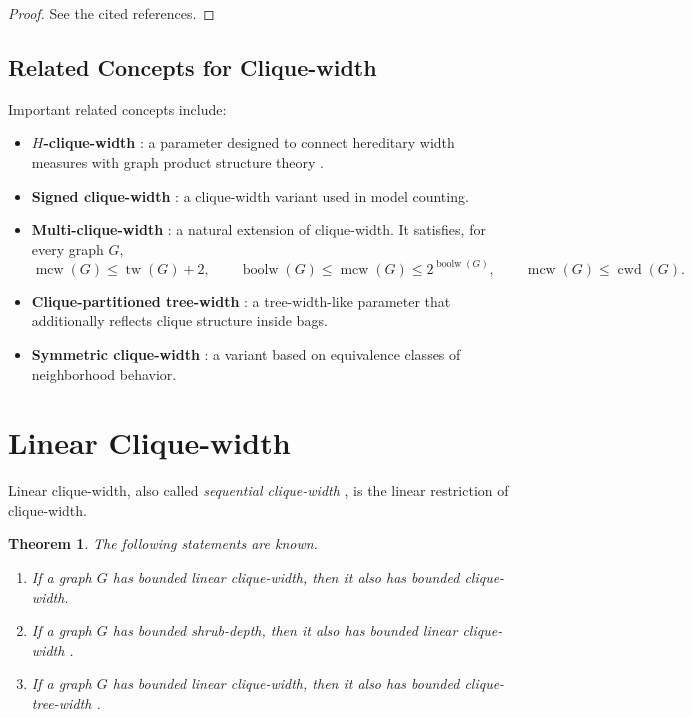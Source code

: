 \documentclass[10pt]{book}
\newtheorem{theorem}{Theorem}[section]
\theoremstyle{definition}
\begin{document}
\begin{proof}
See the cited references.
\end{proof}

\subsection{Related Concepts for Clique-width}

Important related concepts include:

\begin{itemize}
    \item \textbf{\(H\)-clique-width} \cite{139}: a parameter designed to connect hereditary width measures with graph product structure theory \cite{235}.
    \item \textbf{Signed clique-width} \cite{155}: a clique-width variant used in model counting.
    \item \textbf{Multi-clique-width} \cite{186}: a natural extension of clique-width.  
    It satisfies, for every graph \(G\),
    \[
    \operatorname{mcw}(G)\leq \operatorname{tw}(G)+2,
    \qquad
    \operatorname{boolw}(G)\leq \operatorname{mcw}(G)\leq 2^{\operatorname{boolw}(G)},
    \qquad
    \operatorname{mcw}(G)\leq \operatorname{cwd}(G).
    \]
    \cite{186}
    \item \textbf{Clique-partitioned tree-width} \cite{349}: a tree-width-like parameter that additionally reflects clique structure inside bags.
    \item \textbf{Symmetric clique-width} \cite{courcelle2004clique}: a variant based on equivalence classes of neighborhood behavior.
\end{itemize}

\section{Linear Clique-width}
Linear clique-width, also called \emph{sequential clique-width} \cite{fellows2005proving,fellows2005proving2}, is the linear restriction of clique-width.

\begin{theorem}
The following statements are known.
\begin{enumerate}
    \item If a graph \(G\) has bounded linear clique-width, then it also has bounded clique-width.

    \item If a graph \(G\) has bounded shrub-depth, then it also has bounded linear clique-width \cite{31,32}.

    \item If a graph \(G\) has bounded linear clique-width, then it also has bounded clique-tree-width \cite{39}.
\end{enumerate}
\end{theorem}
\end{document}

